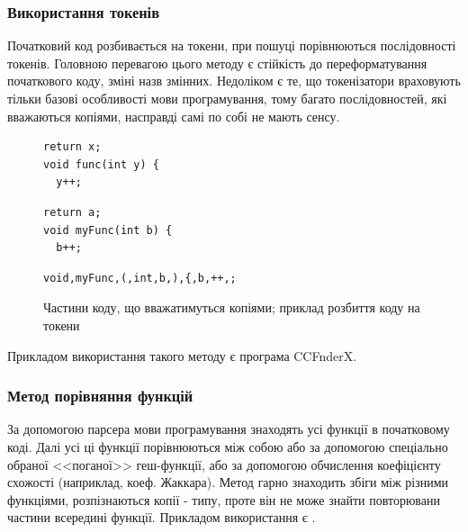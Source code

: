 \documentclass[a4paper, 14pt]{article}
\newcommand{\RNum}[1]{\uppercase\expandafter{\romannumeral #1\relax}}
\begin{document}
\subsubsection{Використання токенів}
Початковий код розбивається на токени, при пошуці порівнюються послідовності токенів.
Головною перевагою цього методу є стійкість до переформатування початкового коду, зміні назв змінних.
Недоліком є те, що токенізатори враховують тільки базові особливості мови програмування, тому багато послідовностей, які вважаються копіями, насправді самі по собі не мають сенсу. \cite{Koschke06}
\begin{figure}[h!]
\centering
\begin{minipage}[t]{.275\textwidth}
\begin{lstlisting}[frame=none]
return x;
void func(int y) {
  y++;
\end{lstlisting}
\end{minipage}
\begin{minipage}[t]{.275\textwidth}
\begin{lstlisting}[frame=none]
return a;
void myFunc(int b) {
  b++;
\end{lstlisting}
\end{minipage}
\begin{minipage}[t]{.35\textwidth}
\begin{lstlisting}[frame=none]
void,myFunc,(,int,b,),{,b,++,;
\end{lstlisting}
\end{minipage}
\caption{Частини коду, що вважатимуться копіями; приклад розбиття коду на токени}
\end{figure}
Прикладом використання такого методу є програма CCFnderX. 
\subsubsection{Метод порівняння функцій}
За допомогою парсера мови програмування знаходять усі функції в початковому коді. Далі усі ці функції порівнюються між собою або за допомогою спеціально обраної <<поганої>> геш-функції, або за допомогою обчислення коефіцієнту схожості (наприклад, коеф. Жаккара).
Метод гарно знаходить збіги між різними функціями, розпізнаються копії \RNum{1}-\RNum{3} типу, проте він не може знайти повторювани частини всередині функції.
Прикладом використання є \cite{Yang18}.
\end{document}

